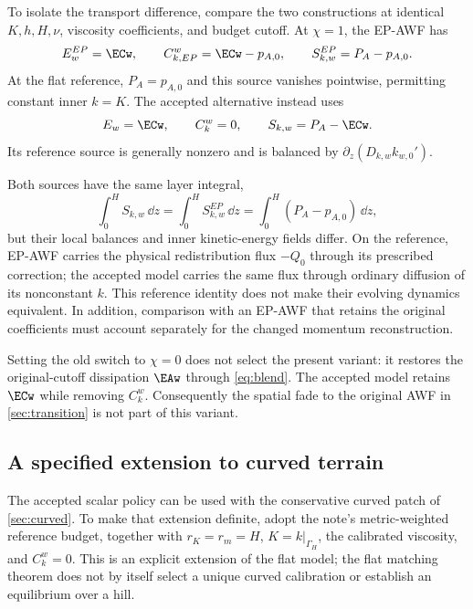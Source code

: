 To isolate the transport difference, compare the two constructions
at identical $K,h,H,\nu$, viscosity coefficients, and budget cutoff.
At $\chi=1$, the EP-AWF has
\begin{equation}
 E_w^{EP}=\ECw,\qquad
 C_{k,EP}^w=\ECw-p_{A,0},\qquad
 S_{k,w}^{EP}=P_A-p_{A,0}.
 \label{eq:accepted-ep-comparison}
\end{equation}
At the flat reference, $P_A=p_{A,0}$ and this source vanishes
pointwise, permitting constant inner $k=K$. The accepted alternative
instead uses
\begin{equation}
 E_w=\ECw,\qquad C_k^w=0,\qquad
 S_{k,w}=P_A-\ECw.
 \label{eq:accepted-source-comparison}
\end{equation}
Its reference source is generally nonzero and is balanced by
$\partial_z(D_{k,w}k_{w,0}')$.

Both sources have the same layer integral,
\begin{equation}
 \int_0^H S_{k,w}\,\dd z
 =\int_0^H S_{k,w}^{EP}\,\dd z
 =\int_0^H(P_A-p_{A,0})\,\dd z,
 \label{eq:accepted-equal-integrated-sources}
\end{equation}
but their local balances and inner kinetic-energy fields differ.
On the reference, EP-AWF carries the physical redistribution flux
$-Q_0$ through its prescribed correction; the accepted model carries
the same flux through ordinary diffusion of its nonconstant $k$.
This reference identity does not make their evolving dynamics
equivalent. In addition, comparison with an EP-AWF that retains the
original coefficients must account separately for the changed
momentum reconstruction.

Setting the old switch to $\chi=0$ does not select the present
variant: it restores the original-cutoff dissipation $\EAw$ through
\cref{eq:blend}. The accepted model retains $\ECw$ while removing
$C_k^w$. Consequently the spatial fade to the original AWF in
\cref{sec:transition} is not part of this variant.

\subsection{A specified extension to curved terrain}
\label{app:accepted-awf-curved}

The accepted scalar policy can be used with the conservative curved
patch of \cref{sec:curved}. To make that extension definite, adopt
the note's metric-weighted reference budget, together with
$r_K=r_m=H$, $K=k|_{\Gamma_H}$, the calibrated viscosity, and
$C_k^w=0$. This is an explicit extension of the flat model; the
flat matching theorem does not by itself select a unique curved
calibration or establish an equilibrium over a hill.

